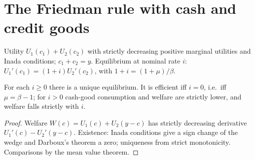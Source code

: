 \section{The Friedman rule with cash and credit goods}

\begin{definition}
\label{def:cia}
\leanok
Utility $U_1(c_1)+U_2(c_2)$ with strictly decreasing positive marginal utilities and Inada conditions; $c_1+c_2=y$. Equilibrium at
nominal rate $i$: $U_1'(c_1)=(1+i)U_2'(c_2)$, with $1+i=(1+\mu)/\beta$.
\end{definition}

\begin{theorem}
\label{thm:cia}
\leanok
{}
For each $i\ge0$ there is a unique equilibrium. It is efficient iff $i=0$, i.e.\ iff $\mu=\beta-1$; for $i>0$ cash-good consumption
and welfare are strictly lower, and welfare falls strictly with $i$.
\end{theorem}
\begin{proof}
\leanok
Welfare $W(c)=U_1(c)+U_2(y-c)$ has strictly decreasing derivative $U_1'(c)-U_2'(y-c)$. Existence: Inada conditions give a sign
change of the wedge and Darboux's theorem a zero; uniqueness from strict monotonicity. Comparisons by the mean value theorem.
\end{proof}
